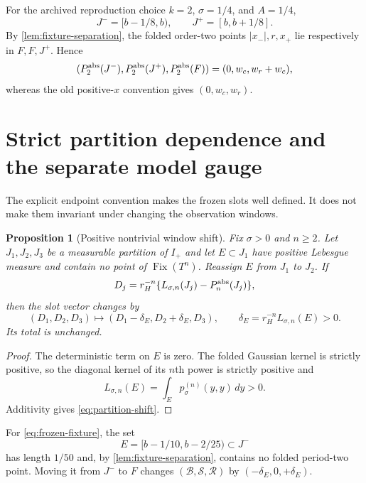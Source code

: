\documentclass[11pt]{article}
\newtheorem{proposition}[theorem]{Proposition}
\theoremstyle{remark}
\newcommand{\Fix}{\operatorname{Fix}}
\newcommand{\cB}{\mathcal B}
\newcommand{\cR}{\mathcal R}
\newcommand{\cS}{\mathcal S}
\begin{document}
For the archived reproduction choice $k=2$, $\sigma=1/4$, and $A=1/4$,
\begin{equation}\label{eq:frozen-fixture}
 J^-=[b-1/8,b),\qquad J^+=[b,b+1/8].
\end{equation}
By \cref{lem:fixture-separation}, the folded order-two points
$|x_-|,r,x_+$ lie respectively in $F,F,J^+$.
Hence
\begin{equation}\label{eq:fixture-slots}
 (P_2^{\rm abs}(J^-),P_2^{\rm abs}(J^+),P_2^{\rm abs}(F))
 =(0,w_c,w_r+w_c),
\end{equation}
whereas the old positive-$x$ convention gives $(0,w_c,w_r)$.

\section{Strict partition dependence and the separate model gauge}

The explicit endpoint convention makes the frozen slots well defined.  It does not
make them invariant under changing the observation windows.

\begin{proposition}[Positive nontrivial window shift]
\label{prop:partition-dependence}
Fix $\sigma>0$ and $n\ge2$.  Let $J_1,J_2,J_3$ be a measurable partition of
$I_+$ and let $E\subset J_1$ have positive Lebesgue measure and contain no
point of $\Fix(T^n)$.  Reassign $E$ from $J_1$ to $J_2$.  If
\[
 D_j=r_H^{-n}\{L_{\sigma,n}(J_j)-P_n^{\rm abs}(J_j)\},
\]
then the slot vector changes by
\begin{equation}\label{eq:partition-shift}
 (D_1,D_2,D_3)\longmapsto
 (D_1-\delta_E,D_2+\delta_E,D_3),
 \qquad
 \delta_E=r_H^{-n}L_{\sigma,n}(E)>0.
\end{equation}
Its total is unchanged.
\end{proposition}

\begin{proof}
The deterministic term on $E$ is zero.  The folded Gaussian kernel is
strictly positive, so the diagonal kernel of its $n$th power is strictly
positive and
\[
 L_{\sigma,n}(E)=\int_Ep_\sigma^{(n)}(y,y)\,dy>0.
\]
Additivity gives \eqref{eq:partition-shift}.
\end{proof}

For \eqref{eq:frozen-fixture}, the set
\begin{equation}\label{eq:E-fixture}
 E=[b-1/10,b-2/25)\subset J^-
\end{equation}
has length $1/50$ and, by \cref{lem:fixture-separation}, contains no folded
period-two point.  Moving it from
$J^-$ to $F$ changes $(\cB,\cS,\cR)$ by
$(-\delta_E,0,+\delta_E)$.
\end{document}
